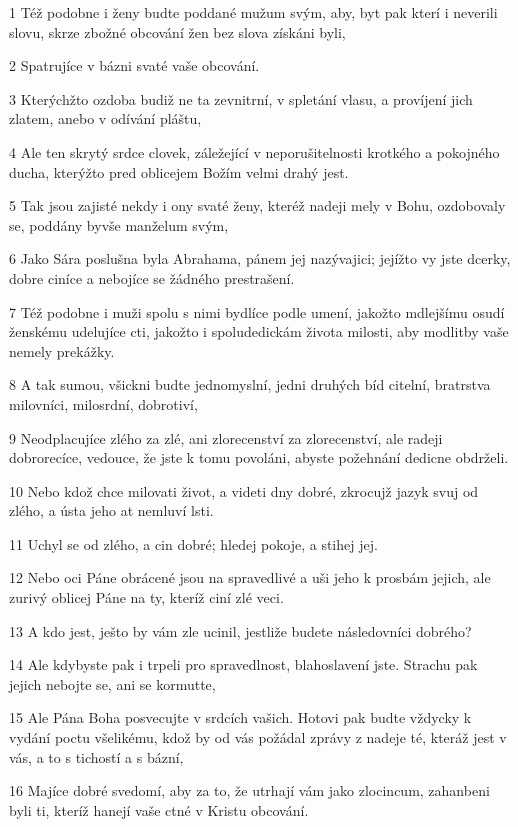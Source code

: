 \par 1 Též podobne i ženy budte poddané mužum svým, aby, byt pak kterí i neverili slovu, skrze zbožné obcování žen bez slova získáni byli,
\par 2 Spatrujíce v bázni svaté vaše obcování.
\par 3 Kterýchžto ozdoba budiž ne ta zevnitrní, v spletání vlasu, a províjení jich zlatem, anebo v odívání pláštu,
\par 4 Ale ten skrytý srdce clovek, záležející v neporušitelnosti krotkého a pokojného ducha, kterýžto pred oblicejem Božím velmi drahý jest.
\par 5 Tak jsou zajisté nekdy i ony svaté ženy, kteréž nadeji mely v Bohu, ozdobovaly se, poddány byvše manželum svým,
\par 6 Jako Sára poslušna byla Abrahama, pánem jej nazývajici; jejížto vy jste dcerky, dobre ciníce a nebojíce se žádného prestrašení.
\par 7 Též podobne i muži spolu s nimi bydlíce podle umení, jakožto mdlejšímu osudí ženskému udelujíce cti, jakožto i spoludedickám života milosti, aby modlitby vaše nemely prekážky.
\par 8 A tak sumou, všickni budte jednomyslní, jedni druhých bíd citelní, bratrstva milovníci, milosrdní, dobrotiví,
\par 9 Neodplacujíce zlého za zlé, ani zlorecenství za zlorecenství, ale radeji dobrorecíce, vedouce, že jste k tomu povoláni, abyste požehnání dedicne obdrželi.
\par 10 Nebo kdož chce milovati život, a videti dny dobré, zkrocujž jazyk svuj od zlého, a ústa jeho at nemluví lsti.
\par 11 Uchyl se od zlého, a cin dobré; hledej pokoje, a stihej jej.
\par 12 Nebo oci Páne obrácené jsou na spravedlivé a uši jeho k prosbám jejich, ale zurivý oblicej Páne na ty, kteríž ciní zlé veci.
\par 13 A kdo jest, ješto by vám zle ucinil, jestliže budete následovníci dobrého?
\par 14 Ale kdybyste pak i trpeli pro spravedlnost, blahoslavení jste. Strachu pak jejich nebojte se, ani se kormutte,
\par 15 Ale Pána Boha posvecujte v srdcích vašich. Hotovi pak budte vždycky k vydání poctu všelikému, kdož by od vás požádal zprávy z nadeje té, kteráž jest v vás, a to s tichostí a s bázní,
\par 16 Majíce dobré svedomí, aby za to, že utrhají vám jako zlocincum, zahanbeni byli ti, kteríž hanejí vaše ctné v Kristu obcování.

